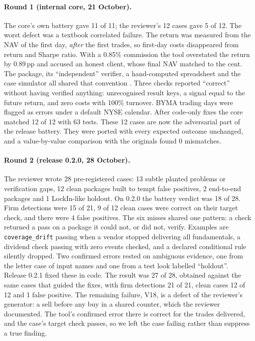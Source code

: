 \documentclass[11pt]{article}
\begin{document}
\paragraph{Round 1 (internal core, 21 October).} The core's own battery gave 11 of 11; the reviewer's 12 cases gave 5 of 12. The worst defect was a textbook correlated failure. The return was measured from the NAV of the first day, \emph{after} the first trades, so first-day costs disappeared from return and Sharpe ratio. With a 0.85\% commission the tool overstated the return by 0.89\,pp and accused an honest client, whose final NAV matched to the cent. The package, its ``independent'' verifier, a hand-computed spreadsheet and the case simulator all shared that convention \citep{KnightLeveson1986}. Three checks reported ``correct'' without having verified anything: unrecognised result keys, a signal equal to the future return, and zero costs with 100\% turnover. BYMA trading days were flagged as errors under a default NYSE calendar. After code-only fixes the core matched 12 of 12 with 63 tests. These 12 cases are now the adversarial part of the release battery. They were ported with every expected outcome unchanged, and a value-by-value comparison with the originals found 0 mismatches.

\paragraph{Round 2 (release 0.2.0, 28 October).} The reviewer wrote 28 pre-registered cases: 13 subtle planted problems or verification gaps, 12 clean packages built to tempt false positives, 2 end-to-end packages and 1 LockIn-like holdout. On 0.2.0 the battery verdict was 18 of 28. Firm detections were 15 of 21, 9 of 12 clean cases were correct on their target check, and there were 4 false positives. The six misses shared one pattern: a check returned a pass on a package it could not, or did not, verify. Examples are \texttt{coverage\_drift} passing when a vendor stopped delivering all fundamentals, a dividend check passing with zero events checked, and a declared conditional rule silently dropped. Two confirmed errors rested on ambiguous evidence, one from the letter case of input names and one from a test look labelled ``holdout''. Release 0.2.1 fixed these in code. The result was 27 of 28, obtained against the same cases that guided the fixes, with firm detections 21 of 21, clean cases 12 of 12 and 1 false positive. The remaining failure, V18, is a defect of the reviewer's generator: a sell before any buy in a shared counter, which the reviewer documented. The tool's confirmed error there is correct for the trades delivered, and the case's target check passes, so we left the case failing rather than suppress a true finding.
\end{document}
